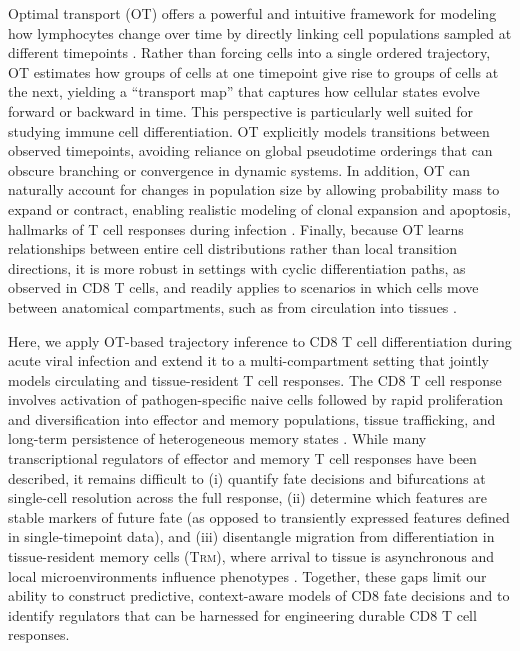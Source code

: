 Optimal transport (OT) offers a powerful and intuitive framework for modeling how lymphocytes change over time by directly linking cell populations sampled at different timepoints \citep{schiebingerOptimalTransportAnalysisSingleCell2019, bunneProximalOptimalTransport2022, kleinMappingCellsTime2025}. Rather than forcing cells into a single ordered trajectory, OT estimates how groups of cells at one timepoint give rise to groups of cells at the next, yielding a ``transport map'' that captures how cellular states evolve forward or backward in time. This perspective is particularly well suited for studying immune cell differentiation. OT explicitly models transitions between observed timepoints, avoiding reliance on global pseudotime orderings that can obscure branching or convergence in dynamic systems. In addition, OT can naturally account for changes in population size by allowing probability mass to expand or contract, enabling realistic modeling of clonal expansion and apoptosis, hallmarks of T cell responses during infection \citep{schiebingerOptimalTransportAnalysisSingleCell2019}. Finally, because OT learns relationships between entire cell distributions rather than local transition directions, it is more robust in settings with cyclic differentiation paths, as observed in CD8 T cells, and readily applies to scenarios in which cells move between anatomical compartments, such as from circulation into tissues \citep{gorinRNAVelocityUnraveled2022, hudsonTechnologyMeetsTILs2022}.

Here, we apply OT-based trajectory inference to CD8 T cell differentiation during acute viral infection and extend it to a multi-compartment setting that jointly models circulating and tissue-resident T cell responses. The CD8 T cell response involves activation of pathogen-specific naive cells followed by rapid proliferation and diversification into effector and memory populations, tissue trafficking, and long-term persistence of heterogeneous memory states \citep{masopustIntegrationCellMigration2013, reina-camposTissueresidentMemoryCD82025, kohCD8TcellSubsets2023, gillLongitudinalAnalysisPhenotype2022, zhangCD8CellsFoot2011}. While many transcriptional regulators of effector and memory T cell responses have been described, it remains difficult to (i) quantify fate decisions and bifurcations at single-cell resolution across the full response, (ii) determine which features are stable markers of future fate (as opposed to transiently expressed features defined in single-timepoint data), and (iii) disentangle migration from differentiation in tissue-resident memory cells (T\textsc{rm}), where arrival to tissue is asynchronous and local microenvironments influence phenotypes \citep{masopustIntegrationCellMigration2013}. Together, these gaps limit our ability to construct predictive, context-aware models of CD8 fate decisions and to identify regulators that can be harnessed for engineering durable CD8 T cell responses.


